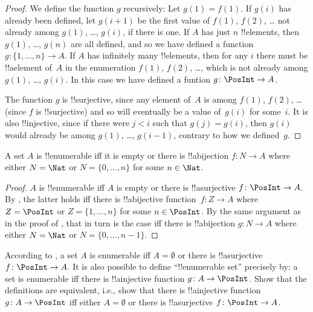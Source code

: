 \documentclass[../../../include/open-logic-section]{subfiles}
\begin{document}
\begin{proof}
  We define the function $g$ recursively: Let $g(1) = f(1)$. If $g(i)$
  has already been defined, let $g(i+1)$ be the first value of $f(1)$,
  $f(2)$, \dots{} not already among $g(1)$, \dots, $g(i)$, if there is
  one. If $A$ has just $n$ !!{element}s, then $g(1)$, \dots, $g(n)$ are all
  defined, and so we have defined a function $g\colon \{1, \dots, n\}
  \to A$. If $A$ has infinitely many !!{element}s, then for any $i$
  there must be !!a{element} of~$A$ in the enumeration $f(1)$, $f(2)$,
  \dots, which is not already among $g(1)$, \dots, $g(i)$. In this
  case we have defined a funtion $g\colon \PosInt \to A$.
  
  The function $g$ is !!{surjective}, since any element of~$A$ is
  among $f(1)$, $f(2)$, \dots{} (since $f$ is !!{surjective}) and so
  will eventually be a value of~$g(i)$ for some~$i$. It is also
  !!{injective}, since if there were $j < i$ such that $g(j) = g(i)$,
  then $g(i)$ would already be among $g(1)$, \dots, $g(i-1)$, contrary
  to how we defined~$g$.
\end{proof}

\begin{cor}
A set $A$ is !!{enumerable} iff it is empty or there is !!a{bijection}
$f\colon N \to A$ where either $N = \Nat$ or $N = \{0, \dots, n\}$ for
some $n \in \Nat$.
\end{cor}

\begin{proof}
$A$ is !!{enumerable} iff $A$ is empty or there is !!a{surjective}
$f\colon \PosInt \to A$. By , the latter holds
iff there is !!a{bijective} function~$f\colon Z \to A$ where $Z =
\PosInt$ or $Z = \{1, \dots, n\}$ for some $n \in \PosInt$. By the
same argument as in the proof of , that in turn
is the case iff there is !!a{bijection} $g\colon N \to A$ where either
$N = \Nat$ or $N = \{0, \dots, n-1\}$.
\end{proof}

\begin{prob}
  According to , a set $A$ is
  enumerable iff $A = \emptyset$ or there is !!a{surjective} $f\colon
  \PosInt \to A$.  It is also possible to define ``!!{enumerable} set''
  precisely by: a set is enumerable iff there is !!a{injective}
  function $g\colon A \to \PosInt$.  Show that the definitions are
  equivalent, i.e., show that there is !!a{injective} function
  $g\colon A \to \PosInt$ iff either $A = \emptyset$ or there is
  !!a{surjective} $f\colon \PosInt \to A$.
\end{prob}
\end{document}
